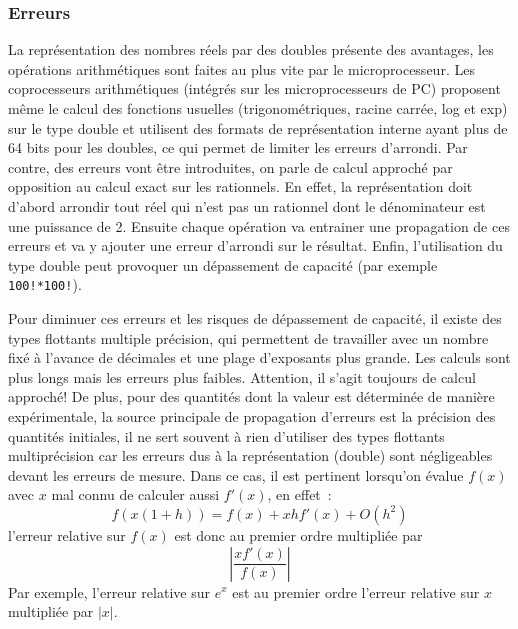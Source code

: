 \documentclass[a4paper,11pt]{article}
\begin{document}
\begin{giacjshere}
\subsubsection{Erreurs} 
La repr\'esentation des nombres r\'eels par des doubles pr\'esente
des avantages, les op\'erations arithm\'etiques
sont faites au plus vite par le microprocesseur.
Les coprocesseurs arithmétiques (intégrés sur les microprocesseurs
de PC) proposent m\^eme
le calcul des fonctions usuelles (trigonométriques, racine carrée, log et exp)
sur le type double et utilisent des formats de représentation interne
ayant plus de 64 bits pour les doubles, ce qui permet de limiter
les erreurs d'arrondi. 
Par contre, des erreurs vont \^etre introduites,
on parle de calcul approch\'e par opposition au calcul exact sur les
rationnels. En effet, la repr\'esentation doit d'abord arrondir 
tout r\'eel qui n'est pas un rationnel dont le d\'enominateur
est une puissance de 2. Ensuite chaque op\'eration va entrainer
une propagation de ces erreurs et va y ajouter une erreur d'arrondi 
sur le r\'esultat.
Enfin, l'utilisation du type double peut provoquer un d\'epassement
de capacit\'e (par exemple \verb|100!*100!|).

Pour diminuer ces erreurs et les risques de d\'epassement de
capacit\'e, il existe des types flottants multiple pr\'ecision,
qui permettent de travailler avec un nombre fix\'e \`a l'avance
de d\'ecimales et une plage d'exposants plus grande. Les calculs sont plus longs mais les erreurs
plus faibles. Attention, il s'agit toujours de calcul approch\'e!
De plus, pour des quantit\'es dont la valeur est d\'etermin\'ee
de mani\`ere exp\'erimentale, la source principale de propagation
d'erreurs est la pr\'ecision des quantit\'es initiales, il ne sert
souvent \`a rien d'utiliser des types flottants multipr\'ecision car les
erreurs dus à la représentation (double) sont négligeables devant
les erreurs de mesure. Dans ce cas, il est pertinent lorsqu'on
\'evalue $f(x)$ avec $x$ mal connu de calculer aussi $f'(x)$, en effet~:
$$ f(x(1+h))= f(x)+xh f'(x) + O(h^2)$$
l'erreur relative sur $f(x)$ est donc au premier ordre multipli\'ee par
$$ |\frac{xf'(x)}{f(x)}|$$
Par exemple, l'erreur relative sur $e^x$ est au premier ordre l'erreur relative sur $x$
multipli\'ee par $|x|$.
\\


\end{giacjshere}
\end{document}
